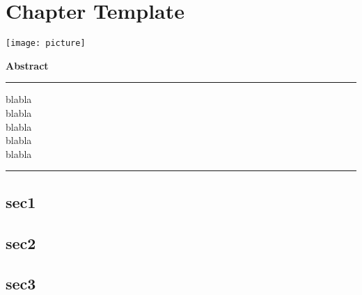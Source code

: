 \chapter{Chapter Template} \label{chap:}
\begin{bibunit}[ieeetr]
\minitoc
\vspace{2cm}

\begin{minipage}[c]{0.45\linewidth}
\texttt{[image: picture]}
\end{minipage}
\hfill
\begin{minipage}[c]{0.45\linewidth}
\textbf{Abstract}
\vspace{2mm}\hrule\vspace{2mm}

blabla\\
blabla\\
blabla\\
blabla\\
blabla\\

\vspace{2mm}\hrule
\end{minipage}

\newpage
\section{sec1}

\newpage
\section{sec2}

\newpage
\section{sec3}

\newpage
{}
\renewcommand{\bibname}{Bibliography of chapter \thechapter}
\end{bibunit}
